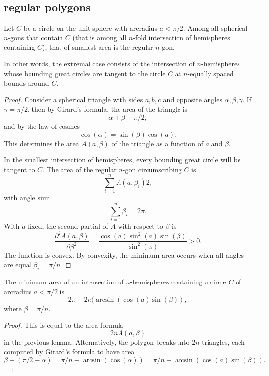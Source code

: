 \subsection{regular polygons}

\begin{lemma}\label{lemma:ngon}
Let $C$ be a circle on the unit sphere with arcradius $a<\pi/2$.  Among all spherical $n$-gons that
contain $C$  (that is among all $n$-fold intersection of hemispheres containing $C$), that of smallest area is the regular $n$-gon.  
\end{lemma}

In other words, the extremal case consists of the intersection of $n$-hemispheres whose bounding great circles are tangent to the circle $C$ at $n$-equally spaced bounds around $C$.

\begin{proof} 
Consider a spherical triangle with sides $a,b,c$ and opposite angles $\alpha,\beta,\gamma$.  If $\gamma=\pi/2$, then by Girard's formula, the area
of the triangle is
$$
\alpha+\beta-\pi/2,
$$
and by the law of cosines 
$$
\cos(\alpha) =\sin(\beta)\cos(a).
$$
This determines the area $A(a,\beta)$ of the triangle 
as a function of $a$ and $\beta$.

In the smallest intersection of hemispheres,  every bounding great circle will be tangent to $C$.
The area of the regular $n$-gon circumscribing $C$ is
$$
\sum_{i=1}^n A(a,\beta_i) 2,
$$
with angle sum
$$
\sum_{i=1}^n \beta_i = 2\pi.
$$
With  $a$ fixed, the second partial of $A$ with respect to $\beta$ is
$$
\frac{\partial^2 A(a,\beta)}{\partial \beta^2} = \frac{\cos(a)\sin^2(a)\sin(\beta)}{\sin^2(\alpha)} > 0.
$$
The function is convex.
By convexity, the minimum area occurs when all angles are equal
$\beta_i = \pi/n$.
\end{proof}

\begin{lemma}\label{lemma:ngon-area}
The minimum area of an intersection of $n$-hemispheres containing a circle $C$ 
of arcradius $a<\pi/2$ is
$$
2\pi - 2 n (\arcsin(\cos(a)\sin(\beta)),
$$
where $\beta = \pi/n$.
\end{lemma}

\begin{proof} This is equal to the area formula
$$
2 n A(a,\beta)
$$
in the previous lemma.
Alternatively, the polygon breaks into $2n$ triangles, each computed by Girard's
formula to have area
$$
\beta - (\pi/2 - \alpha)  = \pi/n - \arcsin(\cos(\alpha)) = 
\pi/n - \arcsin(\cos(a)\sin(\beta)).
$$
\end{proof}


